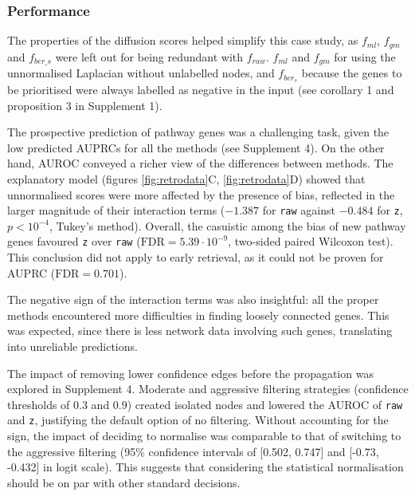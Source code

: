 \documentclass[final]{bioinfo}
\newcommand{\method}{\texttt}
\begin{document}
\subsubsection*{Performance}

The properties of the diffusion scores helped simplify this case study, as $f_{ml}$, $f_{gm}$ and $f_{ber\_s}$ were left out for being redundant with $f_{raw}$.
$f_{ml}$ and $f_{gm}$ for using the unnormalised Laplacian without unlabelled nodes, and $f_{ber_s}$ because the genes to be prioritised were always labelled as negative in the input (see corollary 1 and proposition 3 in Supplement 1).

The prospective prediction of pathway genes was a challenging task, given the low predicted AUPRCs for all the methods (see Supplement 4). 
On the other hand, AUROC conveyed a richer view of the differences between methods. 
The explanatory model (figures \ref{fig:retrodata}C, \ref{fig:retrodata}D) showed that unnormalised scores were more affected by the presence of bias, reflected in the larger magnitude of their interaction terms ($-1.387$ for \method{raw} against $-0.484$ for \method{z}, $p<10^{-4}$, Tukey's method). 
Overall, the casuistic among the bias of new pathway genes favoured \method{z} over \method{raw} ($ \textrm{FDR}=5.39\cdot 10^{-9}$, two-sided paired Wilcoxon test). 
This conclusion did not apply to early retrieval, as it could not be proven for AUPRC ($\textrm{FDR} = 0.701$).

The negative sign of the interaction terms was also insightful: all the proper methods encountered more difficulties in finding loosely connected genes.
This was expected, since there is less network data involving such genes, translating into unreliable predictions.

The impact of removing lower confidence edges before the propagation was explored in Supplement 4. 
Moderate and aggressive filtering strategies (confidence thresholds of $0.3$ and $0.9$) created isolated nodes and lowered the AUROC of \method{raw} and \method{z}, justifying the default option of no filtering.
Without accounting for the sign, the impact of deciding to normalise was comparable to that of switching to the aggressive filtering (95\% confidence intervals of [0.502, 0.747] and [-0.73, -0.432] in logit scale).
This suggests that considering the statistical normalisation should be on par with other standard decisions.
\end{document}
